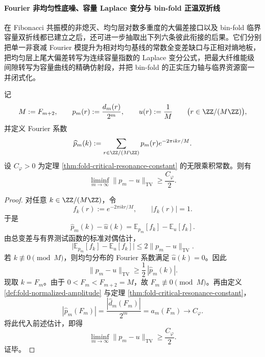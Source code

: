 \paragraph{Fourier 非均匀性底噪、容量 Laplace 变分与 bin-fold 正温双折线}
在 Fibonacci 共振模的非熄灭、均匀层对数多重度的大偏差接口以及 bin-fold 临界容量双折线都已建立之后，还可进一步抽取出下列六条彼此衔接的后果。它们分别把单一非衰减 Fourier 模提升为相对均匀基线的常数全变差缺口与正相对熵地板，把均匀层上尾大偏差转写为连续容量指数的 Laplace 变分公式，把最大纤维能级间隙转写为容量曲线的精确仿射段，并把 bin-fold 的正实压力轴与临界资源窗一并闭式化。

\begin{theorem}\label{thm:xi-time-part9t-fourier-tv-gap-positive-floor}
记
\[
M:=F_{m+2},
\qquad
p_m(r):=\frac{d_m(r)}{2^m},
\qquad
u(r):=\frac{1}{M}
\qquad
\bigl(r\in \ZZ/(M\ZZ)\bigr),
\]
并定义 Fourier 系数
\[
\widehat p_m(k):=
\sum_{r\in \ZZ/(M\ZZ)}p_m(r)e^{-2\pi i kr/M}.
\]
设 \(C_\varphi>0\) 为定理 \ref{thm:fold-critical-resonance-constant} 的无限乘积常数。则有
\[
\liminf_{m\to\infty}\|p_m-u\|_{\mathrm{TV}}
\ge
\frac{C_\varphi}{2}.
\]
\end{theorem}
\begin{proof}
对任意 \(k\in\ZZ/(M\ZZ)\)，令
\[
f_k(r):=e^{-2\pi i kr/M},
\qquad |f_k(r)|=1.
\]
于是
\[
\widehat p_m(k)-\widehat u(k)
=
\mathbb E_{p_m}[f_k]-\mathbb E_u[f_k].
\]
由总变差与有界测试函数的标准对偶估计，
\[
\bigl|\mathbb E_{p_m}[f_k]-\mathbb E_u[f_k]\bigr|
\le
2\|p_m-u\|_{\mathrm{TV}}.
\]
若 \(k\not\equiv 0\pmod M\)，则均匀分布的 Fourier 系数满足 \(\widehat u(k)=0\)。因此
\[
\|p_m-u\|_{\mathrm{TV}}
\ge
\frac12\,|\widehat p_m(k)|.
\]
现取 \(k=F_m\)。由于 \(0<F_m<F_{m+2}=M\)，故 \(F_m\not\equiv 0\pmod M\)。再由定义 \ref{def:fold-normalized-amplitude} 与定理 \ref{thm:fold-critical-resonance-constant}，
\[
|\widehat p_m(F_m)|
=
\frac{|\widehat d_m(F_m)|}{2^m}
=
a_m(F_m)
\longrightarrow
C_\varphi.
\]
将此代入前述估计，即得
\[
\liminf_{m\to\infty}\|p_m-u\|_{\mathrm{TV}}
\ge
\frac{C_\varphi}{2}.
\]
证毕。
\end{proof}

